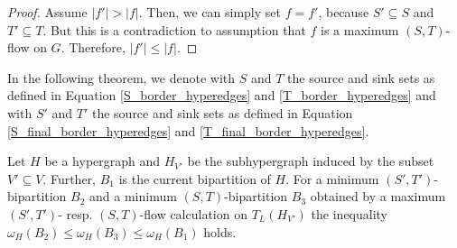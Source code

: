 \begin{proof}
Assume $|f'| > |f|$. Then, we can simply set $f = f'$, because $S' \subseteq S$ and
$T' \subseteq T$. But this is a contradiction to assumption that $f$ is a maximum $(S,T)$-flow
on $G$. Therefore, $|f'| \le |f|$.
\end{proof}

In the following theorem, we denote with $S$ and $T$ the source and sink sets as defined in 
Equation \ref{S_border_hyperedges} and \ref{T_border_hyperedges} and with $S'$ and $T'$ the
source and sink sets as defined in Equation \ref{S_final_border_hyperedges} and
\ref{T_final_border_hyperedges}.

\begin{theorem}
Let $H$ be a hypergraph and $H_{V'}$ be the subhypergraph induced by the subset $V' \subseteq V$.
Further, $B_1$ is the current bipartition of $H$. For a minimum $(S',T')$-bipartition $B_2$ and
a minimum $(S,T)$-bipartition $B_3$ obtained by a maximum $(S',T')$- resp. $(S,T)$-flow calculation
on $T_L(H_{V'})$ the inequality $\omega_H(B_2) \le \omega_H(B_3) \le \omega_H(B_1)$ holds.
\end{theorem}

